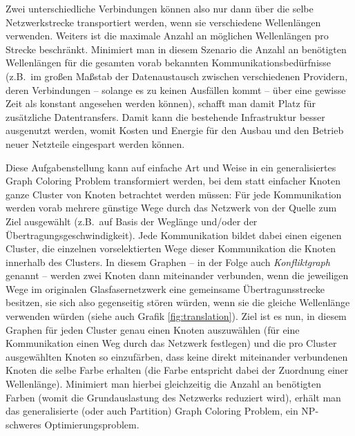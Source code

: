 \documentclass[paper=a4,fontsize=12pt]{scrartcl}
\begin{document}
Zwei unterschiedliche Verbindungen können also nur dann über die selbe Netzwerkstrecke transportiert werden, wenn sie verschiedene Wellenlängen verwenden. Weiters ist die maximale Anzahl an möglichen Wellenlängen pro Strecke beschränkt. Minimiert man in diesem Szenario die Anzahl an benötigten Wellenlängen für die gesamten vorab bekannten Kommunikationsbedürfnisse (z.B.\ im großen Maßstab der Datenaustausch zwischen verschiedenen Providern, deren Verbindungen -- solange es zu keinen Ausfällen kommt -- über eine gewisse Zeit als konstant angesehen werden können), schafft man damit Platz für zusätzliche Datentransfers. Damit kann die bestehende Infrastruktur besser ausgenutzt werden, womit Kosten und Energie für den Ausbau und den Betrieb neuer Netzteile eingespart werden können.

Diese Aufgabenstellung kann auf einfache Art und Weise in ein generalisiertes Graph Coloring Problem transformiert werden, bei dem statt einfacher Knoten ganze Cluster von Knoten betrachtet werden müssen: Für jede Kommunikation werden vorab mehrere günstige Wege durch das Netzwerk von der Quelle zum Ziel ausgewählt (z.B.\ auf Basis der Weglänge und/oder der Übertragungsgeschwindigkeit). Jede Kommunikation bildet dabei einen eigenen Cluster, die einzelnen vorselektierten Wege dieser Kommunikation die Knoten innerhalb des Clusters. In diesem Graphen -- in der Folge auch \emph{Konfliktgraph} genannt -- werden zwei Knoten dann miteinander verbunden, wenn die jeweiligen Wege im originalen Glasfasernetzwerk eine gemeinsame Übertragunsstrecke besitzen, sie sich also gegenseitig stören würden, wenn sie die gleiche Wellenlänge verwenden würden (siehe auch Grafik \ref{fig:translation}). Ziel ist es nun, in diesem Graphen für jeden Cluster genau einen Knoten auszuwählen (für eine Kommunikation einen Weg durch das Netzwerk festlegen) und die pro Cluster ausgewählten Knoten so einzufärben, dass keine direkt miteinander verbundenen Knoten die selbe Farbe erhalten (die Farbe entspricht dabei der Zuordnung einer Wellenlänge). Minimiert man hierbei gleichzeitig die Anzahl an benötigten Farben (womit die Grundauslastung des Netzwerks reduziert wird), erhält man das generalisierte (oder auch Partition) Graph Coloring Problem, ein NP-schweres Optimierungsproblem.
\end{document}
